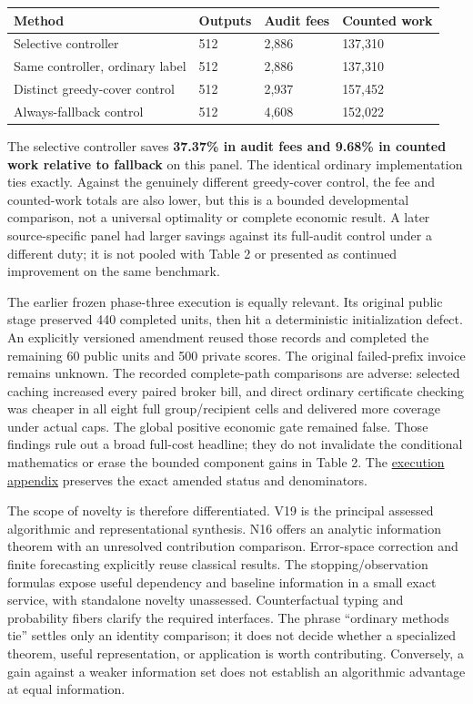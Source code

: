 \documentclass{article}
\theoremstyle{definition}
\begin{document}
{\def\LTcaptype{none} %
\begin{longtable}[]{@{}llll@{}}
\toprule\noalign{}
Method & Outputs & Audit fees & Counted work \\
\midrule\noalign{}
\endhead
\bottomrule\noalign{}
\endlastfoot
Selective controller & 512 & 2,886 & 137,310 \\
Same controller, ordinary label & 512 & 2,886 & 137,310 \\
Distinct greedy-cover control & 512 & 2,937 & 157,452 \\
Always-fallback control & 512 & 4,608 & 152,022 \\
\end{longtable}
}

The selective controller saves \textbf{37.37\% in audit fees and 9.68\%
in counted work relative to fallback} on this panel. The identical
ordinary implementation ties exactly. Against the genuinely different
greedy-cover control, the fee and counted-work totals are also lower,
but this is a bounded developmental comparison, not a universal
optimality or complete economic result. A later source-specific panel
had larger savings against its full-audit control under a different
duty; it is not pooled with Table 2 or presented as continued
improvement on the same benchmark.

The earlier frozen phase-three execution is equally relevant. Its
original public stage preserved 440 completed units, then hit a
deterministic initialization defect. An explicitly versioned amendment
reused those records and completed the remaining 60 public units and 500
private scores. The original failed-prefix invoice remains unknown. The
recorded complete-path comparisons are adverse: selected caching
increased every paired broker bill, and direct ordinary certificate
checking was cheaper in all eight full group/recipient cells and
delivered more coverage under actual caps. The global positive economic
gate remained false. Those findings rule out a broad full-cost headline;
they do not invalidate the conditional mathematics or erase the bounded
component gains in Table 2. The
\href{https://github.com/TristanMiano/value_logic/blob/main/v3/experiments/results.md}{execution
appendix} preserves the exact amended status and denominators.

The scope of novelty is therefore differentiated. V19 is the principal
assessed algorithmic and representational synthesis. N16 offers an
analytic information theorem with an unresolved contribution comparison.
Error-space correction and finite forecasting explicitly reuse classical
results. The stopping/observation formulas expose useful dependency and
baseline information in a small exact service, with standalone novelty
unassessed. Counterfactual typing and probability fibers clarify the
required interfaces. The phrase ``ordinary methods tie'' settles only an
identity comparison; it does not decide whether a specialized theorem,
useful representation, or application is worth contributing. Conversely,
a gain against a weaker information set does not establish an
algorithmic advantage at equal information.
\end{document}

